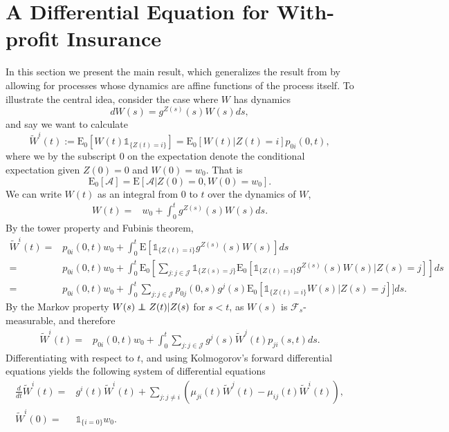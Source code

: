 \documentclass[12pt]{article}
\newcommand{\E}{\text{E}}
\newcommand{\indic}[1]{\mathds{1}_{ \{ #1 \} }}
\newcommand\independent{\protect\mathpalette{\protect\independenT}{\perp}}
\def\independenT#1#2{\mathrel{\rlap{$#1#2$}\mkern2mu{#1#2}}}
\theoremstyle{my_thm}
\begin{document}
\section{A Differential Equation for With-profit Insurance} \label{sec:diff}
In this section we present the main result, which generalizes the result from \citet{Norberg} by allowing for processes whose dynamics are affine functions of the process itself. To illustrate the central idea, consider the case where $W$ has dynamics
$$
dW(s)=g^{Z(s)}(s) W(s) ds,
$$
and say we want to calculate 
$$
\tilde{W}^i(t):=\E_0[W(t)\indic{Z(t)=i}]
=\E_0[W(t)|Z(t)=i]p_{0i}(0,t),
$$ 
where we by the subscript 0 on the expectation denote the conditional expectation given $Z(0)=0$ and $W(0)=w_0$. That is 
$$
\E_0[\mathcal{A}]=\E [\mathcal{A}|Z(0)=0,W(0)=w_0].
$$
We can write $W(t)$ as an integral from 0 to $t$ over the dynamics of $W$,
\begin{align*}
W(t)
=& w_0+\int_0^t  g^{Z(s)}(s) W(s) ds.
\end{align*}
By the tower property and Fubinis theorem,
\begin{align*}
\tilde{W}^i(t)
=&  p_{0i}(0,t) w_0 +
\int_0^t \E[ \indic{Z(t)=i}  g^{Z(s)}(s) W(s)] ds
\\
=&   p_{0i}(0,t) w_0 +
\int_0^t \E_0 \left[ \sum_{j:j \in \mathcal{J}} \indic{Z(s)=j}\E_0[ \indic{Z(t)=i}    g^{Z(s)}(s) W(s)|Z(s)=j] \right] ds\\
=&   p_{0i}(0,t) w_0+
\int_0^t  \sum_{j:j \in \mathcal{J}} p_{0j}(0,s)g^{j}(s)  \E_0[ \indic{Z(t)=i} W(s)|Z(s)=j]] ds.
\end{align*}
By the Markov property $W(s)\independent Z(t)|Z(s)$ for $s<t$, as $W(s)$ is $\mathcal{F}_s$-measurable, and therefore
\begin{align*}
\tilde{W}^i(t)=&  p_{0i}(0,t) w_0 +
\int_0^t  \sum_{j:j \in \mathcal{J}} g^{j}(s)  \tilde{W}^j(t) p_{ji}(s,t)ds.
\end{align*}
Differentiating with respect to $t$, and using Kolmogorov's forward differential equations yields the following system of differential equations
\begin{align*}
\frac{d}{dt} \tilde{W}^i(t)=& g^i(t) \tilde{W}^i(t)+ \sum_{j:j\neq i} \left( \mu_{ji}(t)\tilde{W}^j(t)-\mu_{ij}(t)\tilde{W}^i(t)\right),
\\
\tilde{W}^i(0)=&\indic{i=0}w_0.
\end{align*}
\end{document}
